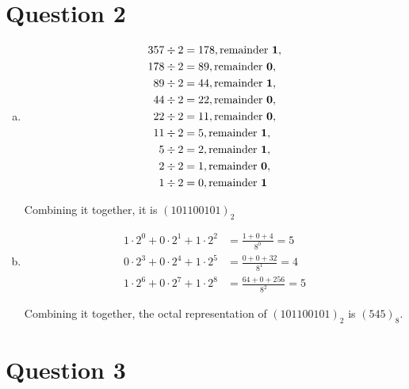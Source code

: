 \documentclass[12pt]{article}
\begin{document}
\section*{Question 2}
\begin{enumerate}[a.]
    \item
    \setcounter{equation}{0}
    \begin{align*}
        357 \div 2 &= 178, \text{remainder \textbf{1}},\\
        178 \div 2 &= 89, \text{remainder \textbf{0}},\\
        89 \div 2 &= 44, \text{remainder \textbf{1}},\\
        44 \div 2 &= 22, \text{remainder \textbf{0}},\\
        22 \div 2 &= 11, \text{remainder \textbf{0}},\\
        11 \div 2 &= 5, \text{remainder \textbf{1}},\\
        5 \div 2 &= 2, \text{remainder \textbf{1}},\\
        2 \div 2 &= 1, \text{remainder \textbf{0}},\\
        1 \div 2 &= 0, \text{remainder \textbf{1}}
    \end{align*}

    Combining it together, it is $(101100101)_2$

    \item

    \begin{align*}
        1 \cdot 2^0 + 0 \cdot 2^1 + 1 \cdot 2^2 &= \frac{1 + 0 + 4}{8^0} = 5\\
        0 \cdot 2^3 + 0 \cdot 2^4 + 1 \cdot 2^5 &= \frac{0 + 0 + 32}{8^1} = 4\\
        1 \cdot 2^6 + 0 \cdot 2^7 + 1 \cdot 2^8 &= \frac{64 + 0 + 256}{8^2} = 5
    \end{align*}

    Combining it together, the octal representation of $(101100101)_2$ is
    $(545)_8$.
\end{enumerate}

\section*{Question 3}
\end{document}
